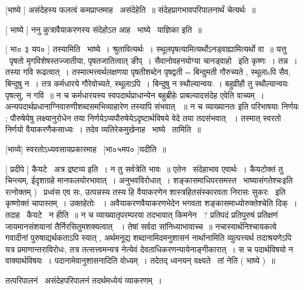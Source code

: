 \documentclass[11pt, openany]{book}
\begin{document}
 [भाष्ये ] असंदेहस्य फलत्वं कमप्राप्तमाह \textendash\ असंदेहेति~॥
संदेहप्रागभावपरिपालनार्थं चेत्यर्थः~॥ 

 [ भाष्ये ] ननु कुत्रावैयाकरणस्य संदेहोऽत आह \textendash\ भाष्ये \textendash\ 
याज्ञिका इति~॥ 

 [ भा० ३ यप० ] तस्यामिति \textendash\ भाष्ये~। श्रुतावित्यर्थः~। 
स्थूलपृषत्यामित्यर्थोऽनड्वाह्यामित्यर्थो वा~॥ यत्तु \textendash\ पृषतो
मृगविशेषस्तज्जातीया, पृषतजातित्वात् ङीप्~। सैवानोवहनयोग्या
चानड्वाहो \textendash\ इति कृष्णः~। तन्न~। तस्या गवि रूढत्वात्~। 
तस्मात्मत्त्वर्थलक्षणया पृषतीशब्देन पृषद्वती$=$बिन्दुमती गौरुच्यते ,
स्थूलाsपि सैव, बिन्दुषु न~। तत्र कर्मधारये गौरेवोच्यते, स्थूलाऽपि~। 
बिन्दुषु न स्थौल्यान्वयः~। बहुव्रीहौ तु स्थौल्यान्वयः पृषत्सु, न गवि~॥
न च कर्मधारयस्य स्वपदार्थप्राधान्येन बहुब्रीहेः प्राबल्यादसंदेह एवेति
वाच्यम्~। अन्यपदार्थप्रधानाग्निवारुणीशब्दसमभिव्याहारेण तस्यापि संभवात्
~॥ न च {\qt व्याख्यानतः} इति परिभाषयाः निर्णयः ; पौरुषेयेषु
लक्ष्यानुरोधेन तया निर्णयेऽप्यपौरुषेयेऽदृष्टार्थविषये वेदे तया तदसंभवात्
~। तस्मात् स्वरतो निर्णयो वैयाकरणैकसाध्यः~। तदेव
व्यतिरेकमु्खेनाह \textendash\ भाष्ये \textendash\ तामिति~॥ 

 [भाव्ये] स्वरतोऽध्यवसायप्रकारमाह \textendash\ [भा०५मप० ]यदीति~॥ 

 [ प्रदीपे ] कैयटे \textendash\ अत्र द्रष्टव्य इति~। न तु सर्वत्रेति भावः~॥
एतेन \textendash\ {\qt संदेहाभाव एवार्थः~।} कैयटोक्तं तु चिन्त्यम्, ईदृशाग्रहे
मानफलयोरभावात्~। अनुभवविरोधात्~। शङ्कासमाधिपरसमस्त \textendash\ भाष्यासंगतेश्चःइति
रत्नोक्तम् ) \textendash\ {\qt प्रध्वंस एव सः}, उत्पन्नस्य तस्य हि वैयाकरणेन
शास्त्रहितसंस्कारवता निरासः सुकरः \textendash\ इति कृष्णोक्तं चापास्तम्~। उक्तहेतोः
~। अवैयाकरणवैयाकरणभेदेन भगवता शङ्कासमाध्योरुक्तेश्चेति दिक्~। 
तदाह \textendash\ कैयटे \textendash\ न हीति~॥ न च {\qt व्याख्यातृपरम्परया तदभावात् किमनेन \textendash\ ?}
प्रतिपदं प्रतिपुरुषं प्रतिक्षणं जायमानसंशयानां तैर्निरसितुमशक्यत्वात्
~। तेषां सर्वदा सांनिध्याभावाच्च~॥ नचास्यार्थनिश्चायकत्वे गवादीनां
पुरुषाद्यर्थकताऽपि स्यात् , अर्थमनूद्य शब्दानामिदमनुशासनं
नार्थानामिति व्युत्पत्त्यर्थ तदाश्रयणेऽपि यत्र प्रमाणान्तराविरोधः, तत्र
तत्सत्त्वमन्यत्र नेत्येवं देवताधिकरणन्यायेनाङ्गीकारात्~। स च पदार्थविषयो
न वाक्यार्थविषयः~। पदानामेवानुशासनादिति वोध्यम्~। तदेतद् ध्वनयन्
वक्ष्यते \textendash\ तां नेति ( भाष्ये )~॥



तत्परिपालनं \textendash\ असंदेहपरिपालनं तदर्थमध्येयं व्याकरणम्~। 
\end{document}
